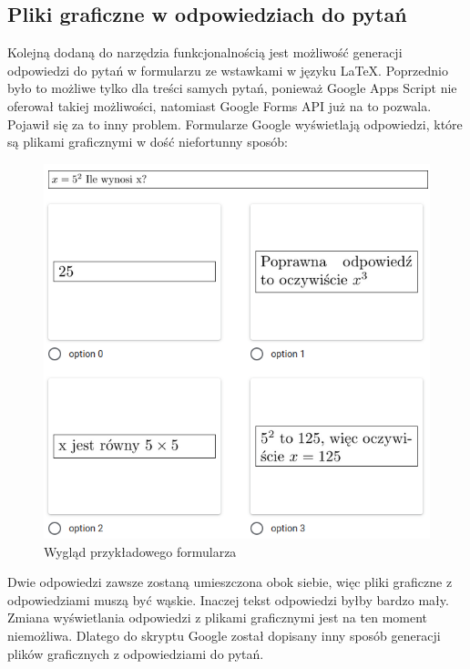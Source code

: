 \subsection{Pliki graficzne w odpowiedziach do pytań}
Kolejną dodaną do narzędzia funkcjonalnością jest możliwość generacji odpowiedzi do pytań
w formularzu ze wstawkami w języku \LaTeX. Poprzednio było to możliwe tylko dla treści samych
pytań, ponieważ Google Apps Script nie oferował takiej możliwości, natomiast Google Forms API 
już na to pozwala. Pojawił się za to inny problem. Formularze Google wyświetlają odpowiedzi,
które są plikami graficznymi
w dość niefortunny sposób:
\begin{figure}[H]
  \centering
   \includegraphics[scale=0.50]{odpowiedzi.png}
   \caption{Wygląd przykładowego formularza}
   \label{fig:1}
 \end{figure}
Dwie odpowiedzi zawsze zostaną umieszczona obok siebie, więc pliki graficzne z odpowiedziami
muszą być wąskie. Inaczej tekst odpowiedzi byłby bardzo mały. Zmiana wyświetlania odpowiedzi
z plikami graficznymi jest na ten moment niemożliwa. Dlatego do skryptu Google został dopisany
inny sposób generacji plików graficznych z odpowiedziami do pytań.

